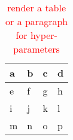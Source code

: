 \begin{table}[h]
\centering
\caption{\textcolor{red}{render a table or a paragraph for hyper-parameters}}
    \begin{tabular}{llll}
    \hline
    a & b & c & d  \\
    \hline
    e & f & g & h  \\
    i & j & k & l  \\
    m & n & o & p 
    \end{tabular}
\end{table}